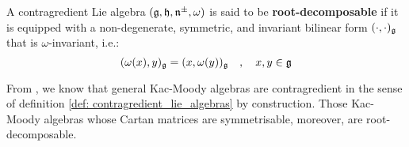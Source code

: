         \begin{definition} \label{def: root_decomposable_lie_algebras}
            A contragredient Lie algebra $(\mathfrak{g}, \mathfrak{h}, \mathfrak{n}^{\pm}, \omega)$ is said to be \textbf{root-decomposable} if it is equipped with a non-degenerate, symmetric, and invariant bilinear form $(\cdot, \cdot)_{\mathfrak{g}}$ that is $\omega$-invariant, i.e.:
                \begin{equation} \label{equation: cartan_invariant_pairing_on_root_decomposable_lie_algebras}
                    (\omega(x), y)_{\mathfrak{g}} = (x, \omega(y))_{\mathfrak{g}} \quad, \quad x, y \in \mathfrak{g}
                \end{equation}
        \end{definition}
        \begin{example} \label{example: symmetrisable_kac_moody_algebras_are_root_decomposable}
            From \cite[Theorem 1.2 and Lemma 3.2]{kac_infinite_dimensional_lie_algebras}, we know that general Kac-Moody algebras are contragredient in the sense of definition \ref{def: contragredient_lie_algebras} by construction. Those Kac-Moody algebras whose Cartan matrices are symmetrisable, moreover, are root-decomposable.
            

\end{example}
